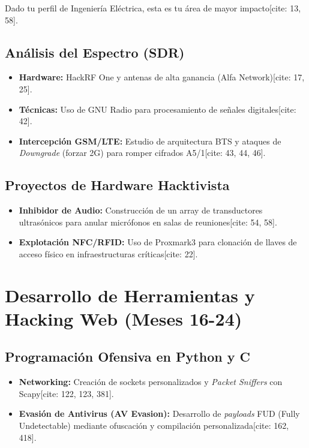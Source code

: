 \documentclass[11pt,a4paper]{report}
\begin{document}
	Dado tu perfil de Ingeniería Eléctrica, esta es tu área de mayor impacto[cite: 13, 58].
	
	\section{Análisis del Espectro (SDR)}
	\begin{itemize}
		\item \textbf{Hardware:} HackRF One y antenas de alta ganancia (Alfa Network)[cite: 17, 25].
		\item \textbf{Técnicas:} Uso de GNU Radio para procesamiento de señales digitales[cite: 42].
		\item \textbf{Intercepción GSM/LTE:} Estudio de arquitectura BTS y ataques de \textit{Downgrade} (forzar 2G) para romper cifrados A5/1[cite: 43, 44, 46].
	\end{itemize}
	
	\section{Proyectos de Hardware Hacktivista}
	\begin{itemize}
		\item \textbf{Inhibidor de Audio:} Construcción de un array de transductores ultrasónicos para anular micrófonos en salas de reuniones[cite: 54, 58].
		\item \textbf{Explotación NFC/RFID:} Uso de Proxmark3 para clonación de llaves de acceso físico en infraestructuras críticas[cite: 22].
	\end{itemize}
	
	\chapter{Desarrollo de Herramientas y Hacking Web (Meses 16-24)}
	
	\section{Programación Ofensiva en Python y C}
	\begin{itemize}
		\item \textbf{Networking:} Creación de sockets personalizados y \textit{Packet Sniffers} con Scapy[cite: 122, 123, 381].
		\item \textbf{Evasión de Antivirus (AV Evasion):} Desarrollo de \textit{payloads} FUD (Fully Undetectable) mediante ofuscación y compilación personalizada[cite: 162, 418].
	\end{itemize}
	
\end{document}
